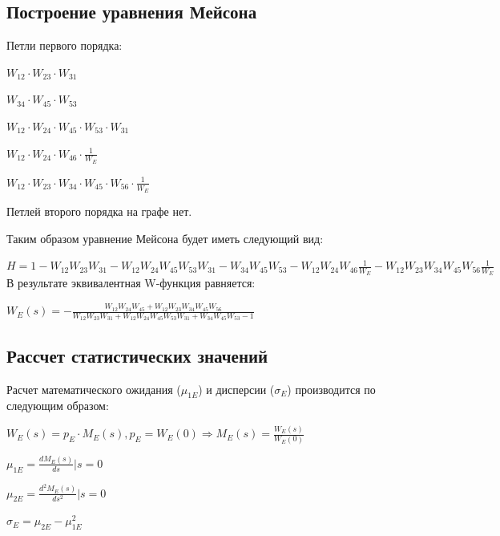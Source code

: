 \documentclass[14pt,a4paper,report]{report}
\begin{document}
\subsection{Построение уравнения Мейсона}

Петли первого порядка:

$W_{12}\cdot W_{23}\cdot W_{31}$

$W_{34}\cdot W_{45}\cdot W_{53}$

$W_{12}\cdot W_{24}\cdot W_{45}\cdot W_{53}\cdot W_{31}$

$W_{12}\cdot W_{24}\cdot W_{46}\cdot \frac{1}{W_E}$

$W_{12}\cdot W_{23}\cdot W_{34}\cdot W_{45}\cdot W_{56}\cdot \frac{1}{W_E}$

Петлей второго порядка на графе нет.

Таким образом уравнение Мейсона будет иметь следующий вид:

$H=1 - W_{12}W_{23}W_{31} - W_{12}W_{24}W_{45}W_{53}W_{31} - W_{34}W_{45}W_{53} - W_{12}W_{24}W_{46}\frac{1}{W_E} - W_{12}W_{23}W_{34}W_{45}W_{56}\frac{1}{W_E}$\\

В результате эквивалентная W-функция равняется:

$W_E(s)=- \frac{W_{12}W_{24}W_{45} + W_{12}W_{23}W_{34}W_{45}W_{56}}{W_{12}W_{23}W_{31} +W_{12}W_{24}W_{45}W_{53}W_{31}+W_{34}W_{45}W_{53} -1}$\\

\subsection{Рассчет статистических значений}

Расчет математического ожидания ($\mu_{1E}$) и дисперсии ($\sigma_E$) производится по следующим образом:

$W_E(s)=p_E\cdot M_E(s), p_E=W_E(0)\Longrightarrow M_E(s)=\frac{W_E(s)}{W_E(0)}$

$\mu_{1E}=\frac{d M_E(s)}{ds}|s=0$

$\mu_{2E}=\frac{d^2 M_E(s)}{ds^2}|s=0$

$\sigma_E=\mu_{2E}-\mu_{1E}^2$\\
\end{document}
